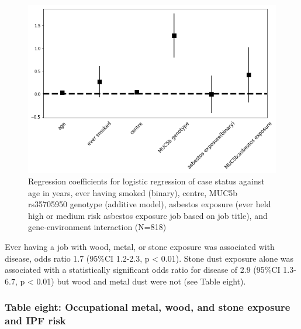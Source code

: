 \documentclass[
]{article}
\begin{document}
\begin{figure}
\centering
\includegraphics{source/figures/regression_coefficients.png}
\caption{Regression coefficients for logistic regression of case status
against age in years, ever having smoked (binary), centre, MUC5b
rs35705950 genotype (additive model), asbestos exposure (ever held high
or medium risk asbestos exposure job based on job title), and
gene-environment interaction (N=818)}
\end{figure}

Ever having a job with wood, metal, or stone exposure was associated
with disease, odds ratio 1.7 (95\%CI 1.2-2.3, p \textless{} 0.01). Stone
dust exposure alone was associated with a statistically significant odds
ratio for disease of 2.9 (95\%CI 1.3-6.7, p \textless{} 0.01) but wood
and metal dust were not (see Table eight).

\hypertarget{table-eight-occupational-metal-wood-and-stone-exposure-and-ipf-risk}{%
\subsubsection{Table eight: Occupational metal, wood, and stone exposure
and IPF
risk}\label{table-eight-occupational-metal-wood-and-stone-exposure-and-ipf-risk}}
\end{document}
